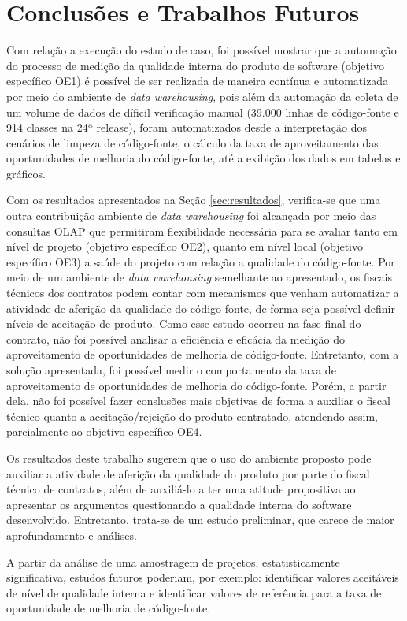 \section{Conclusões e Trabalhos Futuros}


Com relação a execução do estudo de caso, foi possível mostrar que a automação do processo de medição da qualidade interna do produto de software (objetivo específico OE1)  é possível de ser realizada de maneira contínua e automatizada por meio do ambiente de \textit{data warehousing}, pois além da automação da coleta de um volume de dados de díficil verificação manual (39.000 linhas de código-fonte e 914 classes na 24ª release), foram automatizados desde a interpretação dos cenários de limpeza de código-fonte, o cálculo da taxa de aproveitamento das oportunidades de melhoria do código-fonte, até a exibição dos dados em tabelas e gráficos.

Com os resultados apresentados na Seção \ref{sec:resultados}, verifica-se que uma outra contribuição ambiente de \textit{data warehousing} foi alcançada por meio das consultas OLAP que permitiram flexibilidade necessária para se avaliar tanto em nível de projeto (objetivo específico OE2), quanto em nível local (objetivo específico OE3) a saúde do projeto com relação a qualidade do código-fonte. Por meio de um ambiente de \textit{data warehousing} semelhante ao apresentado, os fiscais técnicos dos contratos podem contar com mecanismos que venham automatizar a atividade de aferição da qualidade do código-fonte, de forma seja possível definir níveis de aceitação de produto.
Como esse estudo ocorreu na fase final do contrato, não foi possível analisar a eficiência e eficácia da medição do aproveitamento de oportunidades de melhoria de código-fonte. Entretanto, com a solução apresentada, foi possível medir o comportamento da taxa de aproveitamento de oportunidades de melhoria do código-fonte. Porém, a partir dela, não foi possível fazer conslusões mais objetivas de forma a auxiliar o fiscal técnico quanto a aceitação/rejeição do produto contratado, atendendo assim, parcialmente ao objetivo específico OE4.

Os resultados deste trabalho sugerem que o uso do ambiente proposto pode auxiliar a atividade de aferição da qualidade do produto por parte do fiscal técnico de contratos, além de auxiliá-lo a ter uma atitude propositiva ao apresentar os argumentos questionando a qualidade interna do software desenvolvido. Entretanto, trata-se de um estudo preliminar, que carece de maior aprofundamento e análises.

A partir da análise de uma amostragem de projetos, estatisticamente significativa, estudos futuros poderiam, por exemplo: identificar valores aceitáveis de nível de qualidade interna e identificar valores de referência para a taxa de oportunidade de melhoria de código-fonte.